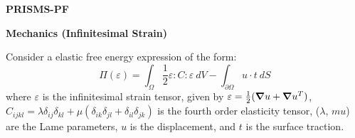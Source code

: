 \documentclass[10pt]{article}
\newcommand{\gv}[1]{\ensuremath{\mbox{\boldmath$ #1 $}}}
\newcommand{\grad}[1]{\gv{\nabla} #1}
\begin{document}
\def\Bomega{\mbox{\boldmath$\omega$}}
\def\Bvarepsilon{\mbox{\boldmath$\varepsilon$}}
\def\Bvartheta{\mbox{\boldmath$\vartheta$}}
\def\Bvarpi{\mbox{\boldmath$\varpi$}}
\def\Bvarrho{\mbox{\boldmath$\varrho$}}
\def\Bvarsigma{\mbox{\boldmath$\varsigma$}}
\def\Bvarphi{\mbox{\boldmath$\varphi$}}
\def\bone{\mathbf{1}}
\def\bzero{\mathbf{0}}
\def\bA{\mbox{\boldmath$ A$}}
\def\bB{\mbox{\boldmath$ B$}}
\def\bC{\mbox{\boldmath$ C$}}
\def\bD{\mbox{\boldmath$ D$}}
\def\bE{\mbox{\boldmath$ E$}}
\def\bF{\mbox{\boldmath$ F$}}
\def\bG{\mbox{\boldmath$ G$}}
\def\bH{\mbox{\boldmath$ H$}}
\def\bI{\mbox{\boldmath$ I$}}
\def\bJ{\mbox{\boldmath$ J$}}
\def\bK{\mbox{\boldmath$ K$}}
\def\bL{\mbox{\boldmath$ L$}}
\def\bM{\mbox{\boldmath$ M$}}
\def\bN{\mbox{\boldmath$ N$}}
\def\bO{\mbox{\boldmath$ O$}}
\def\bP{\mbox{\boldmath$ P$}}
\def\bQ{\mbox{\boldmath$ Q$}}
\def\bR{\mbox{\boldmath$ R$}}
\def\bS{\mbox{\boldmath$ S$}}
\def\bT{\mbox{\boldmath$ T$}}
\def\bU{\mbox{\boldmath$ U$}}
\def\bV{\mbox{\boldmath$ V$}}
\def\bW{\mbox{\boldmath$ W$}}
\def\bX{\mbox{\boldmath$ X$}}
\def\bY{\mbox{\boldmath$ Y$}}
\def\bZ{\mbox{\boldmath$ Z$}}
\def\ba{\mbox{\boldmath$ a$}}
\def\bb{\mbox{\boldmath$ b$}}
\def\bc{\mbox{\boldmath$ c$}}
\def\bd{\mbox{\boldmath$ d$}}
\def\be{\mbox{\boldmath$ e$}}
\def\bff{\mbox{\boldmath$ f$}}
\def\bg{\mbox{\boldmath$ g$}}
\def\bh{\mbox{\boldmath$ h$}}
\def\bi{\mbox{\boldmath$ i$}}
\def\bj{\mbox{\boldmath$ j$}}
\def\bk{\mbox{\boldmath$ k$}}
\def\bl{\mbox{\boldmath$ l$}}
\def\bm{\mbox{\boldmath$ m$}}
\def\bn{\mbox{\boldmath$ n$}}
\def\bo{\mbox{\boldmath$ o$}}
\def\bp{\mbox{\boldmath$ p$}}
\def\bq{\mbox{\boldmath$ q$}}
\def\br{\mbox{\boldmath$ r$}}
\def\bs{\mbox{\boldmath$ s$}}
\def\bt{\mbox{\boldmath$ t$}}
\def\bu{\mbox{\boldmath$ u$}}
\def\bv{\mbox{\boldmath$ v$}}
\def\bw{\mbox{\boldmath$ w$}}
\def\bx{\mbox{\boldmath$ x$}}
\def\by{\mbox{\boldmath$ y$}}
\def\bz{\mbox{\boldmath$ z$}}
\centerline{\Large{\bf PRISMS-PF}}
\smallskip
\centerline{\Large{\bf Mechanics (Infinitesimal Strain)}}
\bigskip
Consider a elastic free energy expression of the form:
\begin{equation}
  \Pi(\varepsilon) = \int_{\Omega}  \frac{1}{2} \varepsilon:C:\varepsilon  ~dV - \int_{\partial \Omega}   u \cdot t  ~dS
\end{equation}
where $\varepsilon$ is the infinitesimal strain tensor, given by $\varepsilon = \frac{1}{2}(\grad u + \grad u^T)$,  $C_{ijkl}=\lambda \delta_{ij} \delta_{kl}+\mu ( \delta_{ik} \delta_{jl}+ \delta_{il} \delta_{jk} )$  is the fourth order elasticity tensor, ($\lambda$, $mu$) are the Lame parameters, $u$ is the displacement, and $t$ is the surface traction.
\end{document}
